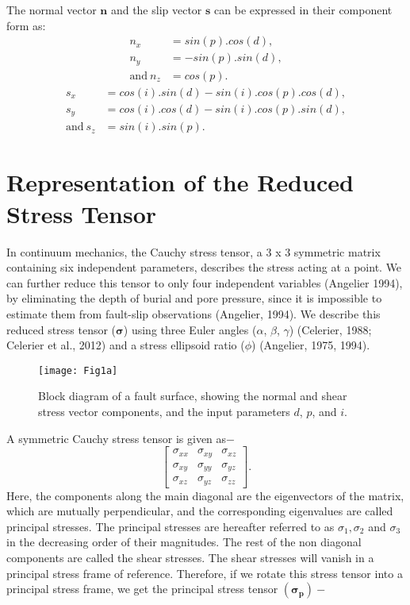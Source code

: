 The normal vector $\bm{n}$ and the slip vector $\bm{s}$ can be expressed in their component form as:
\begin{equation} \label{1}
\begin{split}
n_{x} &= sin(p).cos(d), \\
n_{y} &= -sin(p).sin(d), \\
\text{and}\ n_{z} &= cos(p).    
\end{split}
\end{equation}
\begin{equation} \label{2}
\begin{split}
s_{x} &= cos(i).sin(d) - sin(i).cos(p).cos(d), \\
s_{y} &= cos(i).cos(d) - sin(i).cos(p).sin(d),\\
\text{and}\ s_{z} &= sin(i).sin(p).
\end{split}
\end{equation}

\section{Representation of the Reduced Stress Tensor}
In continuum mechanics, the Cauchy stress tensor, a 3 x 3 symmetric matrix containing six independent parameters, describes the stress acting at a point. We can further reduce this tensor to only four independent variables (Angelier 1994), by eliminating the depth of burial and pore pressure, since it is impossible to estimate them from fault-slip observations (Angelier, 1994). We describe this reduced stress tensor ($\bm{\sigma}$) using three Euler angles ($\alpha$, $\beta$, $\gamma$) (Celerier, 1988; Celerier et al., 2012) and a stress ellipsoid ratio ($\phi$) (Angelier, 1975, 1994). 

\begin{figure}[h]
\centering
\texttt{[image: Fig1a]}
\caption{Block diagram of a fault surface, showing the normal and shear stress vector components, and the input parameters $d$, $p$, and $i$.}
\label{fig2}
\end{figure}

A symmetric Cauchy stress tensor is given as$-$
\[ 
\begin{bmatrix}
\sigma_{xx} & \sigma_{xy} & \sigma_{xz}\\
\sigma_{xy} & \sigma_{yy} & \sigma_{yz}\\
\sigma_{xz} & \sigma_{yz} & \sigma_{zz}
\end{bmatrix}.
\]
Here, the components along the main diagonal are the eigenvectors of the matrix, which are mutually perpendicular, and the corresponding eigenvalues are called principal stresses. The principal stresses are hereafter referred to as $\sigma_{1}, \sigma_{2}$ and $\sigma_{3}$ in the decreasing order of their magnitudes. The rest of the non diagonal components are called the shear stresses. The shear stresses will vanish in a principal stress frame of reference. Therefore, if we rotate this stress tensor into a principal stress frame, we get the principal stress tensor $ ( \bm{\sigma_{p}} ) - $

